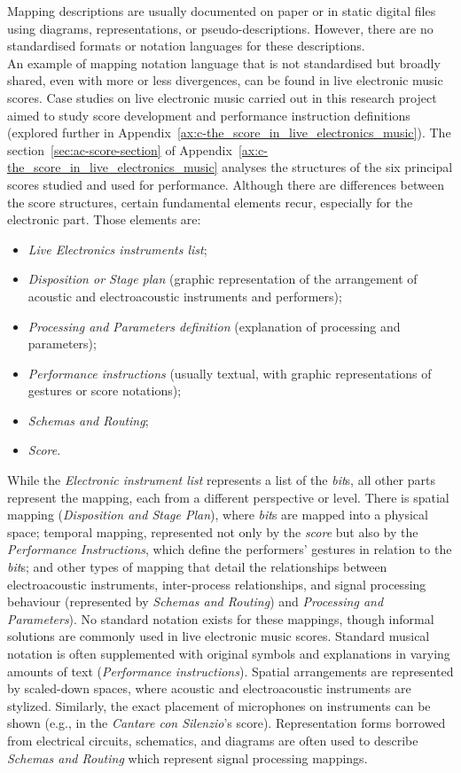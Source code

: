Mapping descriptions are usually documented on paper or in static digital files using diagrams, representations, or pseudo-descriptions. However, there are no standardised formats or notation languages for these descriptions.\\
An example of mapping notation language that is not standardised but broadly shared, even with more or less divergences, can be found in live electronic music scores. Case studies on live electronic music carried out in this research project aimed to study score development and performance instruction definitions (explored further in Appendix~\ref{ax:c-the_score_in_live_electronics_music}). The section~\ref{sec:ac-score-section} of Appendix~\ref{ax:c-the_score_in_live_electronics_music} analyses the structures of the six principal scores studied and used for performance. Although there are differences between the score structures, certain fundamental elements recur, especially for the electronic part. Those elements are:
\begin{itemize}
    \item \textit{Live Electronics instruments list};
    \item \textit{Disposition or Stage plan} (graphic representation of the arrangement of acoustic and electroacoustic instruments and performers);
    \item \textit{Processing and Parameters definition} (explanation of processing and parameters);
    \item \textit{Performance instructions} (usually textual, with graphic representations of gestures or score notations);
    \item \textit{Schemas and Routing};
    \item \textit{Score}.
\end{itemize}
While the \textit{Electronic instrument list} represents a list of the \textit{bit}s, all other parts represent the mapping, each from a different perspective or level. There is spatial mapping (\textit{Disposition and Stage Plan}), where \textit{bit}s are mapped into a physical space; temporal mapping, represented not only by the \textit{score} but also by the \textit{Performance Instructions}, which define the performers' gestures in relation to the \textit{bit}s; and other types of mapping that detail the relationships between electroacoustic instruments, inter-process relationships, and signal processing behaviour (represented by \textit{Schemas and Routing}) and \textit{Processing and Parameters}). No standard notation exists for these mappings, though informal solutions are commonly used in live electronic music scores. Standard musical notation is often supplemented with original symbols and explanations in varying amounts of text (\textit{Performance instructions}). Spatial arrangements are represented by scaled-down spaces, where acoustic and electroacoustic instruments are stylized. Similarly, the exact placement of microphones on instruments can be shown (e.g., in the \textit{Cantare con Silenzio}’s score). Representation forms borrowed from electrical circuits, schematics, and diagrams are often used to describe \textit{Schemas and Routing} which represent signal processing mappings.\\
